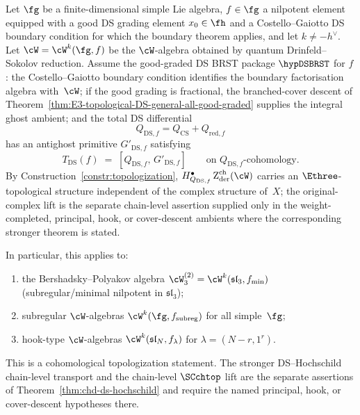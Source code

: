 \begin{theorem}\label{thm:E3-topological-DS-general}
Let $\fg$ be a finite-dimensional simple Lie algebra,
$f \in \fg$ a nilpotent element equipped with a good DS grading
element \(x_0\in\fh\) and a Costello--Gaiotto DS boundary condition
for which the boundary theorem applies, and let \(k\ne -h^\vee\). Let
$\cW = \cW^k(\fg, f)$ be the $\cW$-algebra obtained by
quantum Drinfeld--Sokolov reduction. Assume the good-graded DS BRST
package \(\hypDSBRST\) for \(f\): the Costello--Gaiotto boundary
condition identifies the boundary factorisation algebra with~\(\cW\);
if the good grading is fractional, the branched-cover descent of
Theorem~\ref{thm:E3-topological-DS-general-all-good-graded} supplies
the integral ghost ambient; and the total DS differential
\[
Q_{\mathrm{DS},f}=Q_{\mathrm{CS}}+Q_{\mathrm{red},f}
\]
has an antighost primitive \(G'_{\mathrm{DS},f}\) satisfying
\begin{equation}\label{eq:T-DS-BRST-general}
T_{\mathrm{DS}}(f) \;=\;
[Q_{\mathrm{DS},f},\, G'_{\mathrm{DS},f}]\qquad
\text{on $Q_{\mathrm{DS},f}$-cohomology.}
\end{equation}
By Construction~\textup{\ref{constr:topologization}},
$H_{Q_{\mathrm{DS},f}}^\bullet\Zder^{\mathrm{ch}}(\cW)$ carries an
$\Ethree$-topological structure independent of the complex
structure of~$X$; the original-complex lift is the separate
chain-level assertion supplied only in the weight-completed,
principal, hook, or cover-descent ambients where the corresponding
stronger theorem is stated.

In particular, this applies to:
\begin{enumerate}[label=\textup{(\alph*)},nosep]
\item the Bershadsky--Polyakov algebra
 $\cW_3^{(2)} = \cW^k(\mathfrak{sl}_3, f_{\min})$
 \textup{(}subregular/minimal nilpotent in
 $\mathfrak{sl}_3$\textup{)};
\item subregular $\cW$-algebras
 $\cW^k(\fg, f_{\mathrm{subreg}})$ for all simple~$\fg$;
\item hook-type $\cW$-algebras
 $\cW^k(\mathfrak{sl}_N, f_\lambda)$ for
 $\lambda = (N{-}r, 1^r)$.
\end{enumerate}
This is a cohomological topologization statement. The stronger
DS--Hochschild chain-level transport and the chain-level
\(\SCchtop\) lift are the separate assertions of
Theorem~\ref{thm:chd-ds-hochschild} and require the named
principal, hook, or cover-descent hypotheses there.
\end{theorem}

